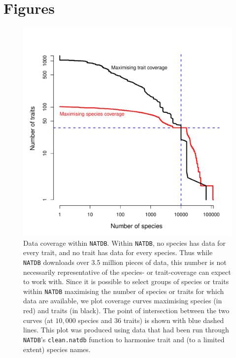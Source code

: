 \documentclass[12pt]{report}
\newcommand{\natdb}{\texttt{NATDB}\xspace}
\begin{document}
\clearpage
\printbibliography

\clearpage
\section*{Figures}
\begin{figure}[h!]
  \includegraphics[width=.8\textwidth]{coverage.pdf}
  \caption{\doublespacing Data coverage within \natdb. Within \natdb,
    no species has data for every trait, and no trait has data for
    every species.  Thus while \natdb downloads over 3.5 million
    pieces of data, this number is not necessarily representative of
    the species- or trait-coverage can expect to work with. Since it
    is possible to select groups of species or traits within \natdb
    maximising the number of species or traits for which data are
    available, we plot coverage curves maximising species (in red) and
    traits (in black). The point of intersection between the two
    curves (at $10,000$ species and $36$ traits) is shown with blue
    dashed lines. This plot was produced using data that had been run
    through \natdb's \texttt{clean.natdb} function to harmonise trait
    and (to a limited extent) species names.}
  \label{coverage}
\end{figure}

\clearpage
\end{document}
